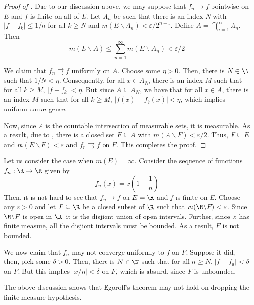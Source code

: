 \begin{proof}[Proof of ]
    Due to our discussion above, we may suppose that $f_n\to f$ pointwise on $E$ and $f$ is finite on all of $E$. Let $A_n$ be such that there is an index $N$ with $|f - f_k|\le 1/n$ for all $k\ge N$ and $m(E\backslash A_n) < \varepsilon/2^{n + 1}$. Define $A = \bigcap\limits_{n = 1}^\infty A_n$. Then 
    \begin{equation*}
        m(E\backslash A)\le \sum_{n = 1}^\infty m(E\backslash A_n) < \varepsilon/2
    \end{equation*}

    We claim that $f_n\rightrightarrows f$ uniformly on $A$. Choose some $\eta > 0$. Then, there is $N\in\N$ such that $1/N < \eta$. Consequently, for all $x\in A_N$, there is an index $M$ such that for all $k\ge M$, $|f - f_k| < \eta$. But since $A\subseteq A_N$, we have that for all $x\in A$, there is an index $M$ such that for all $k\ge M$, $|f(x) - f_k(x)| < \eta$, which implies uniform convergence.

    Now, since $A$ is the countable intersection of measurable sets, it is measurable. As a result, due to , there is a closed set $F\subseteq A$ with $m(A\backslash F) < \varepsilon/2$. Thus, $F\subseteq E$ and $m(E\backslash F) < \varepsilon$ and $f_n\rightrightarrows f$ on $F$. This completes the proof.
\end{proof}

\begin{mdframed}
Let us consider the case when $m(E) = \infty$. Consider the sequence of functions $f_n:\R\to\R$ given by 
\begin{equation*}
    f_n(x) = x\left(1 - \frac{1}{n}\right)
\end{equation*}
Then, it is not hard to see that $f_n\to f$ on $E = \R$ and $f$ is finite on $E$. Choose any $\varepsilon > 0$ and let $F\subseteq\R$ be a closed subset of $\R$ such that $m(\R\backslash F) < \varepsilon$. Since $\R\backslash F$ is open in $\R$, it is the disjiont union of open intervals. Further, since it has finite measure, all the disjiont intervals must be bounded. As a result, $F$ is not bounded.

We now claim that $f_n$ may not converge uniformly to $f$ on $F$. Suppose it did, then, pick some $\delta > 0$. Then, there is $N\in\N$ such that for all $n\ge N$, $|f - f_n| < \delta$ on $F$. But this implies $|x/n| < \delta$ on $F$, which is absurd, since $F$ is unbounded.
\end{mdframed}
The above discussion shows that Egoroff's theorem may not hold on dropping the finite measure hypothesis.

